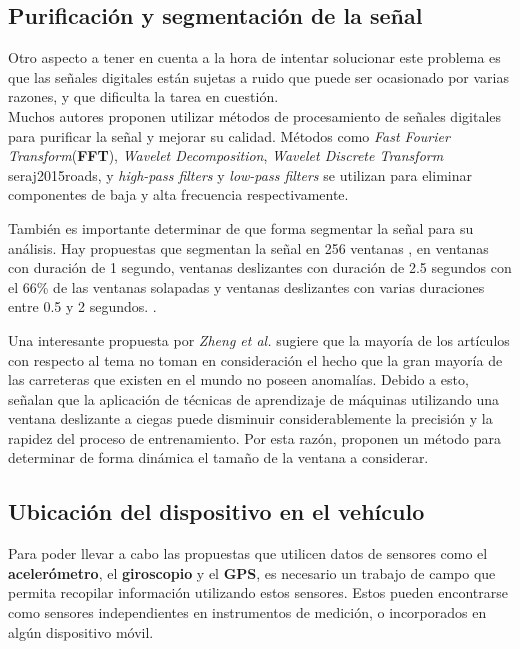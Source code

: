 	\subsection{Purificación y segmentación de la señal}
		Otro aspecto a tener en cuenta a la hora de intentar solucionar este problema es que las señales digitales están sujetas a ruido que puede ser
		ocasionado por varias razones, y que dificulta la tarea en cuestión.\\
		\indent Muchos autores proponen utilizar métodos de procesamiento de señales digitales para purificar la señal y mejorar su calidad. Métodos como \emph
		{Fast Fourier Transform}(\textbf{FFT}), \emph{Wavelet Decomposition}, \emph{Wavelet Discrete Transform}\brackcite
		{seraj2015roads}, y \emph{high-pass filters} y \emph{low-pass filters} se utilizan para eliminar
		componentes de baja y alta frecuencia respectivamente.
			
			También es importante determinar de que forma segmentar la señal para su análisis. Hay propuestas que segmentan la señal en 256 ventanas
		, en ventanas con duración de 1 segundo, ventanas deslizantes con duración de 2.5 
		segundos con el 66\% de las ventanas solapadas y ventanas deslizantes con varias duraciones entre 0.5 y 2 segundos.
		.

			Una interesante propuesta por \emph{Zheng et al.} sugiere que la mayoría de los artículos con respecto al tema no
		toman en consideración el hecho que la gran mayoría de las carreteras que existen en el mundo no poseen anomalías. Debido a esto, señalan que la aplicación
		de técnicas de aprendizaje de máquinas utilizando una ventana deslizante a ciegas puede disminuir considerablemente la precisión y la rapidez del proceso de
		entrenamiento. Por esta razón, proponen un método para determinar de forma dinámica el tamaño de la ventana a considerar.\\
		
	\subsection{Ubicación del dispositivo en el vehículo}
		Para poder llevar a cabo las propuestas que utilicen datos de sensores como el \textbf{acelerómetro}, 
		el \textbf{giroscopio} y el \textbf{GPS}, es necesario un trabajo de campo que permita recopilar información utilizando estos 
		sensores. Estos pueden encontrarse como sensores independientes en instrumentos de medición, o incorporados en algún dispositivo móvil.


